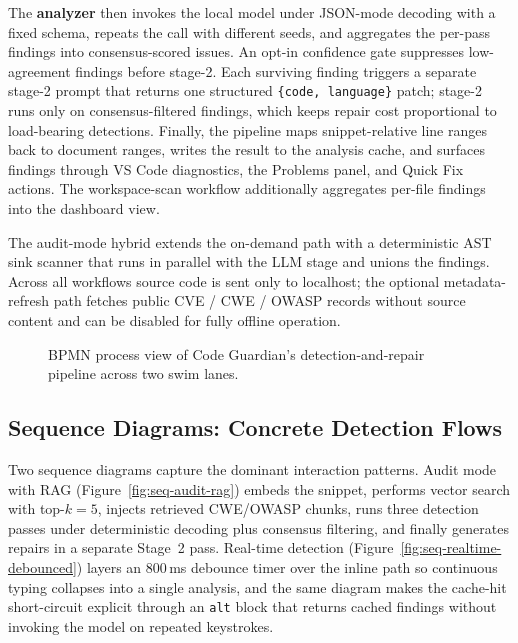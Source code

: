 The \textbf{analyzer} then invokes the local model under JSON-mode decoding with a fixed schema, repeats the call with different seeds, and aggregates the per-pass findings into consensus-scored issues. An opt-in confidence gate suppresses low-agreement findings before stage-2. Each surviving finding triggers a separate stage-2 prompt that returns one structured \texttt{\{code, language\}} patch; stage-2 runs only on consensus-filtered findings, which keeps repair cost proportional to load-bearing detections. Finally, the pipeline maps snippet-relative line ranges back to document ranges, writes the result to the analysis cache, and surfaces findings through VS Code diagnostics, the Problems panel, and Quick Fix actions. The workspace-scan workflow additionally aggregates per-file findings into the dashboard view.

The audit-mode hybrid extends the on-demand path with a deterministic AST sink scanner that runs in parallel with the LLM stage and unions the findings. Across all workflows source code is sent only to localhost; the optional metadata-refresh path fetches public CVE / CWE / OWASP records without source content and can be disabled for fully offline operation.

\begin{figure}
  \centering
  \caption{BPMN process view of Code Guardian's detection-and-repair pipeline across two swim lanes.}
  \label{fig:bpmn}
\end{figure}

\FloatBarrier

\subsection{Sequence Diagrams: Concrete Detection Flows}
\label{sec:sequence-diagrams}

Two sequence diagrams capture the dominant interaction patterns. Audit mode with RAG (Figure~\ref{fig:seq-audit-rag}) embeds the snippet, performs vector search with top-$k=5$, injects retrieved CWE/OWASP chunks, runs three detection passes under deterministic decoding plus consensus filtering, and finally generates repairs in a separate Stage~2 pass. Real-time detection (Figure~\ref{fig:seq-realtime-debounced}) layers an 800\,ms debounce timer over the inline path so continuous typing collapses into a single analysis, and the same diagram makes the cache-hit short-circuit explicit through an \texttt{alt} block that returns cached findings without invoking the model on repeated keystrokes.


